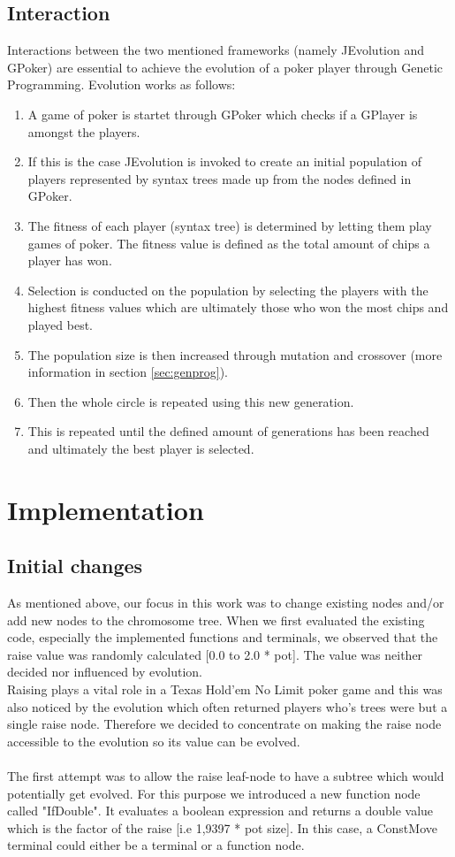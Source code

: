 \documentclass[12pt,fleqn,a4paper]{article}
\begin{document}
\subsection{Interaction}
Interactions between the two mentioned frameworks (namely JEvolution and GPoker) are essential to achieve the evolution of a poker player through Genetic Programming. Evolution works as follows:
\begin{enumerate}
	\item A game of poker is startet through GPoker which checks if a GPlayer is amongst the players.
	\item If this is the case JEvolution is invoked to create an initial population of players represented by syntax trees
	made up from the nodes defined in GPoker.
	\item The fitness of each player (syntax tree) is determined by letting them play games of poker. The fitness value is defined as the total amount of chips a player has won.
	\item Selection is conducted on the population by selecting the players with the highest fitness values which are ultimately those who won the most chips and played best.
	\item The population size is then increased through mutation and crossover (more information in section \ref{sec:genprog}).
	\item Then the whole circle is repeated using this new generation.
	\item This is repeated until the defined amount of generations has been reached and ultimately the best player is selected.
\end{enumerate}

\section{Implementation}
\subsection{Initial changes}
As mentioned above, our focus in this work was to change existing nodes and/or add
new nodes to the chromosome tree. When we first evaluated the existing code, especially the implemented functions and terminals, we observed that the raise value was randomly calculated [0.0 to 2.0 * pot]. The value was neither decided nor influenced by evolution. \\
Raising plays a vital role in a Texas Hold'em No Limit poker game and this was also noticed by the evolution which often returned players who's trees were but a single raise node.
Therefore we decided to concentrate on making the raise node accessible to the evolution so its value can be evolved.
\\ \\ 
The first attempt was to allow the raise leaf-node to have a subtree which would potentially get evolved. For this purpose we introduced a new function node called "IfDouble". It evaluates a boolean expression and returns a double value which is the factor of the raise [i.e 1,9397 * pot size]. In this case, a ConstMove terminal could either be a terminal or a function node.
\end{document}

